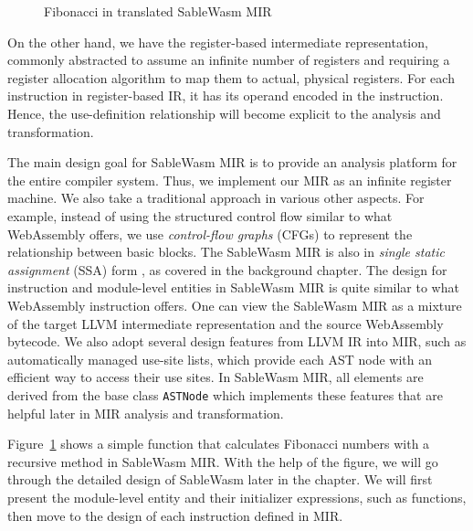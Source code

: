 \begin{figure}
    \centering
    
    \caption{Fibonacci in translated SableWasm MIR}
    \label{fig:mir-fibonacci}
\end{figure}

On the other hand, we have the register-based intermediate representation,
commonly abstracted to assume an infinite number of registers and requiring a
register allocation algorithm to map them to actual, physical registers. For
each instruction in register-based IR, it has its operand encoded in the
instruction. Hence, the use-definition relationship will become explicit to the
analysis and transformation.

The main design goal for SableWasm MIR is to provide an analysis platform for
the entire compiler system. Thus, we implement our MIR as an infinite register
machine. We also take a traditional approach in various other aspects. For
example, instead of using the structured control flow similar to what
WebAssembly offers, we use \emph{control-flow graphs} (CFGs) to represent the
relationship between basic blocks. The SableWasm MIR is also in
\emph{single static assignment} (SSA) form \cite{ibm-ssa}, as covered in the
background chapter. The design for instruction and module-level entities in
SableWasm MIR is quite similar to what WebAssembly instruction offers. One can
view the SableWasm MIR as a mixture of the target LLVM intermediate
representation and the source WebAssembly bytecode. We also adopt several design
features from LLVM IR into MIR, such as automatically managed use-site lists,
which provide each AST node with an efficient way to access their use sites.
In SableWasm MIR, all elements are derived from the base class \texttt{ASTNode}
which implements these features that are helpful later in MIR analysis and
transformation.

Figure~\ref{fig:mir-fibonacci} shows a simple function that calculates Fibonacci
numbers with a recursive method in SableWasm MIR. With the help of the figure,
we will go through the detailed design of SableWasm later in the chapter. We
will first present the module-level entity and their initializer
expressions, such as functions, then move to the design of each instruction
defined in MIR.






